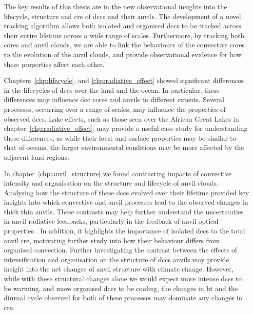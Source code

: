 The key results of this thesis are in the new observational insights into the lifecycle, structure and \acrshort{cre} of \acrshort{dcc}s and their anvils.
The development of a novel tracking algorithm allows both isolated and organised \acrshort{dcc}s to be tracked across their entire lifetime across a wide range of scales.
Furthermore, by tracking both cores and anvil clouds, we are able to link the behaviours of the convective cores to the evolution of the anvil clouds, and provide observational evidence for how these properties affect each other.

Chapters~\ref{chp:lifecycle}, and \ref{chp:radiative_effect} showed significant differences in the lifecycles of \acrshort{dcc}s over the land and the ocean.
In particular, these differences may influence \acrshort{dcc} cores and anvils to different extents.
Several processes, occurring over a range of scales, may influence the properties of observed \acrshort{dcc}s.
Lake effects, such as those seen over the African Great Lakes in chapter~\ref{chp:radiative_effect}, may provide a useful case study for understanding these differences, as while their local and surface properties may be similar to that of oceans, the larger environmental conditions may be more affected by the adjacent land regions.

In chapter~\ref{chp:anvil_structure} we found contrasting impacts of convective intensity and organisation on the structure and lifecycle of anvil clouds. 
Analysing how the structure of these \acrshort{dcc}s evolved over their lifetime provided key insights into which convective and anvil processes lead to the observed changes in thick thin anvils.
These contrasts may help further understand the uncertainties in anvil radiative feedbacks, particularly in the feedback of anvil optical properties \citep{mckim_weak_2024}.
In addition, it highlights the importance of isolated \acrshort{dcc}s to the total anvil \acrshort{cre}, motivating further study into how their behaviour differs from organised convection.
Further investigating the contrast between the effects of intensification and organisation on the structure of \acrshort{dcc}s anvils may provide insight into the net changes of anvil structure with climate change. However, while with these structural changes alone we would expect more intense \acrshort{dcc}s to be warming, and more organised \acrshort{dcc}s to be cooling, the changes in \acrshort{bt} and the diurnal cycle observed for both of these processes may dominate any changes in \acrshort{cre}.

